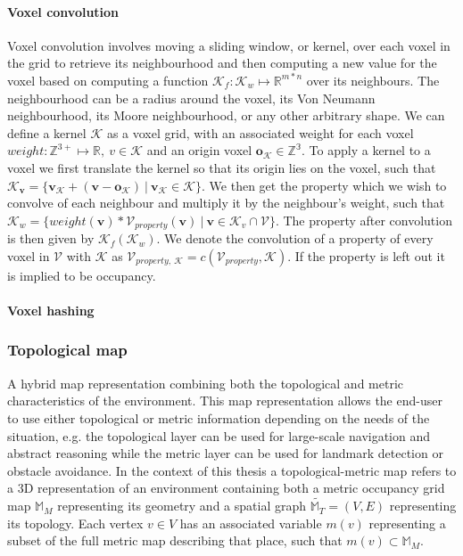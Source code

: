 \paragraph{Voxel convolution}
Voxel convolution involves moving a sliding window, or kernel, over each voxel in the grid to retrieve its neighbourhood and then computing a new value for the voxel based on computing a function \(\mathcal{K}_f: \mathcal{K}_w \mapsto \mathbb{R}^{m*n}\) over its neighbours. The neighbourhood can be a radius around the voxel, its Von Neumann neighbourhood, its Moore neighbourhood, or any other arbitrary shape. We can define a kernel \(\mathcal{K}\) as a voxel grid, with an associated weight for each voxel \(weight: \mathbb{Z}^{3+} \mapsto \mathbb{R},\ v \in {\mathcal{K}}\) and an origin voxel \(\boldsymbol{o_{\mathcal{K}}} \in \mathbb{Z^{3}}\). To apply a kernel to a voxel we first translate the kernel so that its origin lies on the voxel, such that \(\mathcal{K}_{\boldsymbol{v}} = \{\boldsymbol{v_{\mathcal{K}}} + (\boldsymbol{v} - \boldsymbol{o_{\mathcal{K}}})\ |\ \boldsymbol{v_{\mathcal{K}}} \in \mathcal{K}\}\). We then get the property which we wish to convolve of each neighbour and multiply it by the neighbour's weight, such that \(\mathcal{K}_{w} = \{weight(\boldsymbol{v}) * \mathcal{V}_{property}(\boldsymbol{v})\ |\ \boldsymbol{v} \in \mathcal{K}_{v} \cap \mathcal{V}\}\). The property after convolution is then given by \(\mathcal{K}_f(\mathcal{K}_{w})\). We denote the convolution of a property of every voxel in \(\mathcal{V}\) with \(\mathcal{K}\) as \(\mathcal{V}_{property,\  \mathcal{K}} = c(\mathcal{V}_{property},\mathcal{K})\). If the property is left out it is implied to be occupancy.


\paragraph{Voxel hashing}

\subsubsection{Topological map}
A hybrid map representation combining both the topological and metric characteristics of the environment. This map representation allows the end-user to use either topological or metric information depending on the needs of the situation, e.g. the topological layer can be used for large-scale navigation and abstract reasoning while the metric layer can be used for landmark detection or obstacle avoidance. In the context of this thesis a topological-metric map refers to a 3D representation of an environment containing both a metric occupancy grid map \(\mathbb{M}_M\) representing its geometry and a spatial graph \(\widetilde{\mathbb{M}_T}=(V, E)\) representing its topology. Each vertex \(v \in V\) has an associated variable \(m(v)\) representing a subset of the full metric map describing that place, such that \(m(v) \subset \mathbb{M}_M\).

